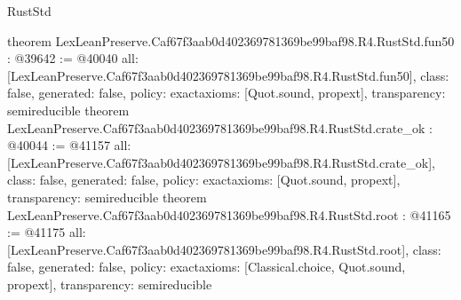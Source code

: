 \begin{lexlean}{RustStd}
\begin{coremodule}
{}
theorem LexLeanPreserve.Caf67f3aab0d402369781369be99baf98.R4.RustStd.fun50 : @39642 := @40040 {
  all: [LexLeanPreserve.Caf67f3aab0d402369781369be99baf98.R4.RustStd.fun50],
  class: false,
  generated: false,
  policy: exact{axioms: [Quot.sound, propext]},
  transparency: semireducible
}
theorem LexLeanPreserve.Caf67f3aab0d402369781369be99baf98.R4.RustStd.crate_ok : @40044 := @41157 {
  all: [LexLeanPreserve.Caf67f3aab0d402369781369be99baf98.R4.RustStd.crate_ok],
  class: false,
  generated: false,
  policy: exact{axioms: [Quot.sound, propext]},
  transparency: semireducible
}
theorem LexLeanPreserve.Caf67f3aab0d402369781369be99baf98.R4.RustStd.root : @41165 := @41175 {
  all: [LexLeanPreserve.Caf67f3aab0d402369781369be99baf98.R4.RustStd.root],
  class: false,
  generated: false,
  policy: exact{axioms: [Classical.choice, Quot.sound, propext]},
  transparency: semireducible
}


\end{coremodule}
\end{lexlean}
